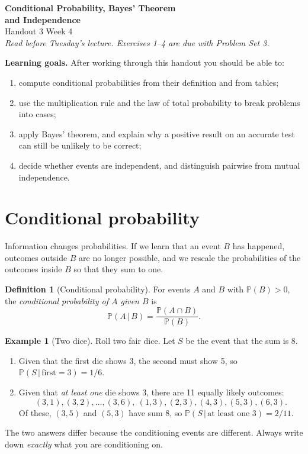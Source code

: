 \documentclass[11pt,letterpaper]{article}
\theoremstyle{definition}
\newtheorem{definition}{Definition}
\newtheorem{example}{Example}
\theoremstyle{plain}
\newcommand{\Prob}{\mathbb{P}}
\newcommand{\given}{\,\vert\,}
\begin{document}
\begin{center}
  {\LARGE\bfseries Conditional Probability, Bayes' Theorem\\[3pt] and Independence}\\[8pt]
  {\large Handout 3 \quad\textbullet\quad Week 4}\\[4pt]
  \textit{Read before Tuesday's lecture. Exercises 1--4 are due with Problem Set 3.}
\end{center}

\vspace{6pt}
\noindent\textbf{Learning goals.} After working through this handout you should be able to:
\begin{enumerate}[nosep]
  \item compute conditional probabilities from their definition and from tables;
  \item use the multiplication rule and the law of total probability to break problems into cases;
  \item apply Bayes' theorem, and explain why a positive result on an accurate test can still be unlikely to be correct;
  \item decide whether events are independent, and distinguish pairwise from mutual independence.
\end{enumerate}

\section{Conditional probability}

Information changes probabilities. If we learn that an event $B$ has happened, outcomes outside $B$ are no longer possible, and we rescale the probabilities of the outcomes inside $B$ so that they sum to one.

\begin{definition}[Conditional probability]
For events $A$ and $B$ with $\Prob(B) > 0$, the \emph{conditional probability of $A$ given $B$} is
\begin{equation}\label{eq:cond}
  \Prob(A \given B) = \frac{\Prob(A \cap B)}{\Prob(B)}.
\end{equation}
\end{definition}

\begin{example}[Two dice]\label{ex:dice}
Roll two fair dice. Let $S$ be the event that the sum is 8.
\begin{enumerate}[label=(\alph*), nosep]
  \item Given that the first die shows 3, the second must show 5, so $\Prob(S \given \text{first} = 3) = 1/6$.
  \item Given that \emph{at least one} die shows 3, there are 11 equally likely outcomes:
  \[
    (3,1),(3,2),\dots,(3,6),\ (1,3),(2,3),(4,3),(5,3),(6,3).
  \]
  Of these, $(3,5)$ and $(5,3)$ have sum 8, so $\Prob(S \given \text{at least one } 3) = 2/11$.
\end{enumerate}
The two answers differ because the conditioning events are different. Always write down \emph{exactly} what you are conditioning on.
\end{example}
\end{document}
